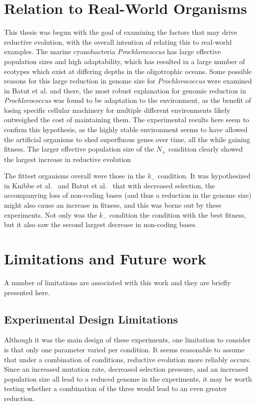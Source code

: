 \section{Relation to Real-World Organisms}

This thesis was begun with the goal of examining the factors that may drive reductive evolution, with the overall intention of relating this to real-world examples. The marine cyanobacteria \textit{Prochlorococcus} has large effective population sizes and high adaptability, which has resulted in a large number of ecotypes which exist at differing depths in the oligotrophic oceans. Some possible reasons for this large reduction in genome size for \textit{Prochlorococcus} were examined in Batut et al.\cite{Batut.2014} and there, the most robust explanation for genomic reduction in \textit{Prochlorococcus} was found to be adaptation to the environment, as the benefit of losing specific cellular machinery for multiple different environments likely outweighed the cost of maintaining them. The experimental results here seem to confirm this hypothesis, as the highly stable environment seems to have allowed the artificial organisms to shed superfluous genes over time, all the while gaining fitness. The larger effective population size of the $N_+$ condition clearly showed the largest increase in reductive evolution

The fittest organisms overall were those in the $k_-$ condition. It was hypothesized in Knibbe et al.~\cite{Knibbe2007} and Batut et al.~\cite{Batut.2013} that with decreased selection, the accompanying loss of non-coding bases (and thus a reduction in the genome size) might also cause an increase in fitness, and this was borne out by these experiments. Not only was the $k_-$ condition the condition with the best fitness, but it also saw the second largest decrease in non-coding bases. 
  
\section{Limitations and Future work}\label{limitations}
A number of limitations are associated with this work and they are briefly presented here. 
\subsection{Experimental Design Limitations}
Although it was the main design of these experiments, one limitation to consider is that only one parameter varied per condition. It seems reasonable to assume that under a combination of conditions, reductive evolution more reliably occurs. Since an increased mutation rate, decreased selection pressure, and an increased population size all lead to a reduced genome in the experiments, it may be worth testing whether a combination of the three would lead to an even greater reduction. 

